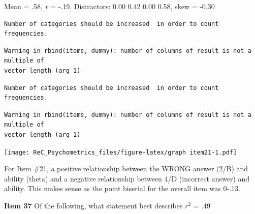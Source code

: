 \documentclass[
  english,
]{book}
\newenvironment{Shaded}{\begin{snugshade}}{\end{snugshade}}
\newcommand{\AttributeTok}[1]{\textcolor[rgb]{0.77,0.63,0.00}{#1}}
\newcommand{\DecValTok}[1]{\textcolor[rgb]{0.00,0.00,0.81}{#1}}
\newcommand{\FunctionTok}[1]{\textcolor[rgb]{0.00,0.00,0.00}{#1}}
\newcommand{\NormalTok}[1]{#1}
\newcommand{\SpecialCharTok}[1]{\textcolor[rgb]{0.00,0.00,0.00}{#1}}
\begin{document}
Mean = .58, \emph{r} = -.19, Distractors: 0.00 0.42 0.00 0.58, skew = -0.30

\begin{Shaded}
\end{Shaded}

\begin{verbatim}
Number of categories should be increased  in order to count frequencies. 
\end{verbatim}

\begin{verbatim}
Warning in rbind(items, dummy): number of columns of result is not a multiple of
vector length (arg 1)
\end{verbatim}

\begin{verbatim}
Number of categories should be increased  in order to count frequencies. 
\end{verbatim}

\begin{verbatim}
Warning in rbind(items, dummy): number of columns of result is not a multiple of
vector length (arg 1)
\end{verbatim}

\texttt{[image: ReC\_Psychometrics\_files/figure-latex/graph item21-1.pdf]}

For Item \#21, a positive relationship between the WRONG answer (2/B) and ability (theta) and a negative relationship between 4/D (incorrect answer) and ability. This makes sense as the point biserial for the overall item was 0-.13.

\textbf{Item 37} Of the following, what statement best describes \(r^2\) = .49
\end{document}
